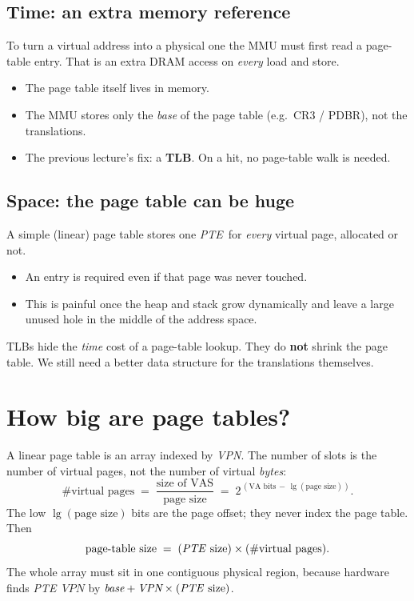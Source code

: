 \documentclass[11pt,a4paper]{article}
\newcommand{\vpn}{\textit{VPN}}
\newcommand{\pte}{\textit{PTE}}
\begin{document}
\subsection{Time: an extra memory reference}
To turn a virtual address into a physical one the MMU must first read a
page-table entry. That is an extra DRAM access on \emph{every} load and
store.
\begin{itemize}
  \item The page table itself lives in memory.
  \item The MMU stores only the \emph{base} of the page table
        (e.g.\ CR3 / PDBR), not the translations.
  \item The previous lecture's fix: a \textbf{TLB}. On a hit, no page-table
        walk is needed.
\end{itemize}

\subsection{Space: the page table can be huge}
A simple (linear) page table stores one \pte\ for \emph{every} virtual
page, allocated or not.
\begin{itemize}
  \item An entry is required even if that page was never touched.
  \item This is painful once the heap and stack grow dynamically and leave
        a large unused hole in the middle of the address space.
\end{itemize}

\begin{warnbox}
TLBs hide the \emph{time} cost of a page-table lookup.
They do \textbf{not} shrink the page table.
We still need a better data structure for the translations themselves.
\end{warnbox}

\section{How big are page tables?}

A linear page table is an array indexed by \vpn. The number of
slots is the number of virtual pages, not the number of virtual
\emph{bytes}:
\[
  \#\text{virtual pages}
  \;=\;
  \frac{\text{size of VAS}}{\text{page size}}
  \;=\;
  2^{\,(\text{VA bits}\,-\,\lg(\text{page size}))}.
\]
The low \(\lg(\text{page size})\) bits are the page offset; they never
index the page table. Then
\[
  \text{page-table size}
  \;=\;
  (\text{\pte\ size})
  \times
  (\#\text{virtual pages}).
\]
The whole array must sit in one contiguous physical region, because
hardware finds \pte\ \(\vpn\) by
\(\textit{base} + \vpn \times (\text{\pte\ size})\).
\end{document}
